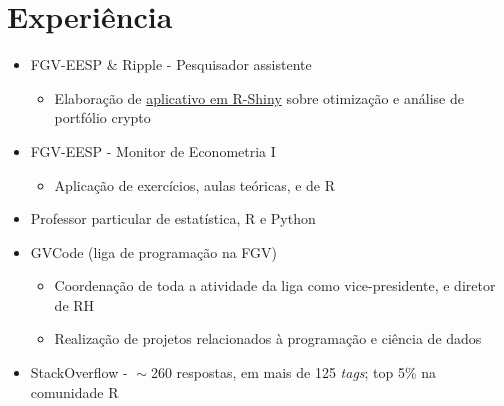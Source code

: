\documentclass[10pt,letterpaper]{article}
\begin{document}
\section{Experiência}
\hspace{-0.6cm}
\begin{minipage}[t]{.47\textwidth}
    \begin{itemize}
        \item FGV-EESP \& Ripple - Pesquisador assistente
        \begin{itemize}
            \item Elaboração de \href{https://github.com/mevaldt/diversified_crypto}{aplicativo em R-Shiny} sobre otimização e análise de portfólio crypto
        \end{itemize}

        \item FGV-EESP - Monitor de Econometria I
        \begin{itemize}
            \item Aplicação de exercícios, aulas teóricas, e de R 
        \end{itemize}

        \item Professor particular de estatística, R e Python
    \end{itemize}
\end{minipage}
\hfill
\begin{minipage}[t]{.47\textwidth}
    \begin{itemize}
        \item GVCode (liga de programação na FGV)
        \begin{itemize}
            \item Coordenação de toda a atividade da liga como vice-presidente, e diretor de RH
            \item Realização de projetos relacionados à programação e ciência de dados
        \end{itemize}

        \item StackOverflow - $\!\sim$260 respostas, em mais de 125 \textit{tags}; top 5\% na comunidade R
    \end{itemize}
\end{minipage}
\end{document}
